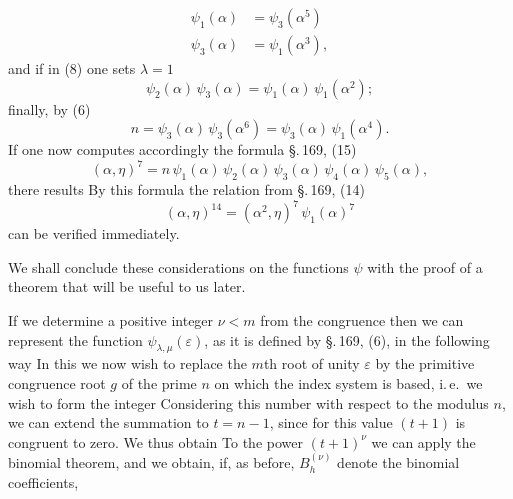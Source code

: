 
\[
\begin{aligned}
\psi_1(\alpha) &= \psi_3(\alpha^5)\\
\psi_3(\alpha) &= \psi_1(\alpha^3),
\end{aligned}
\]
and if in (8) one sets $\lambda = 1$
\[
\psi_2(\alpha)\,\psi_3(\alpha) = \psi_1(\alpha)\,\psi_1(\alpha^2);
\]
finally, by (6)
\[
n = \psi_3(\alpha)\,\psi_3(\alpha^6) = \psi_3(\alpha)\,\psi_1(\alpha^4).
\]
If one now computes accordingly the formula \S.\,169, (15)
\[
(\alpha, \eta)^7 = n\,\psi_1(\alpha)\,\psi_2(\alpha)\,\psi_3(\alpha)\,\psi_4(\alpha)\,\psi_5(\alpha),
\]
there results
By this formula the relation from \S.\,169, (14)
\[
(\alpha, \eta)^{14} = (\alpha^2, \eta)^7\,\psi_1(\alpha)^7
\]
can be verified immediately.

We shall conclude these considerations on the functions $\psi$ with the proof of a theorem that will be useful to us later.

If we determine a positive integer $\nu < m$ from the congruence
then we can represent the function $\psi_{\lambda,\mu}(\varepsilon)$, as it is defined by \S.\,169, (6), in the following way
In this we now wish to replace the $m$th root of unity $\varepsilon$ by the primitive congruence root $g$ of the prime $n$ on which the index system is based, i.\,e.\ we wish to form the integer
Considering this number with respect to the modulus $n$, we can extend the summation to $t = n - 1$, since for this value $(t + 1)$ is congruent to zero. We thus obtain
To the power $(t + 1)^\nu$ we can apply the binomial theorem, and we obtain, if, as before, $B_h^{(\nu)}$ denote the binomial coefficients,

